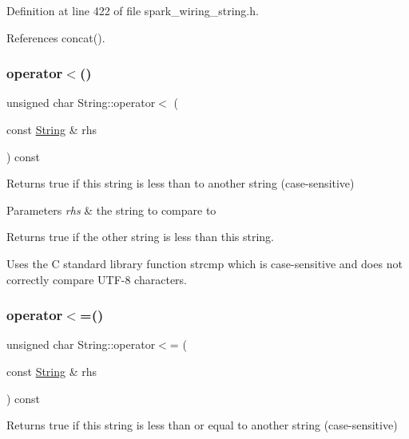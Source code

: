 Definition at line 422 of file spark\+\_\+wiring\+\_\+string.\+h.



References concat().

\mbox{\label{class_string_ae536c93957c3e2369a94bbdf99037681}} 
\subsubsection{\texorpdfstring{operator$<$()}{operator<()}}
{\footnotesize\ttfamily unsigned char String\+::operator$<$ (\begin{DoxyParamCaption}\item[{const \hyperlink{class_string}{String} \&}]{rhs }\end{DoxyParamCaption}) const}



Returns true if this string is less than to another string (case-\/sensitive) 


\begin{DoxyParams}{Parameters}
{\em rhs} & the string to compare to\\
\hline
\end{DoxyParams}
\begin{DoxyReturn}{Returns}
true if the other string is less than this string.
\end{DoxyReturn}
Uses the C standard library function strcmp which is case-\/sensitive and does not correctly compare U\+T\+F-\/8 characters. \mbox{\label{class_string_a111fa1bc3ab1c20223cc8940cd122278}} 
\subsubsection{\texorpdfstring{operator$<$=()}{operator<=()}}
{\footnotesize\ttfamily unsigned char String\+::operator$<$= (\begin{DoxyParamCaption}\item[{const \hyperlink{class_string}{String} \&}]{rhs }\end{DoxyParamCaption}) const}



Returns true if this string is less than or equal to another string (case-\/sensitive) 


